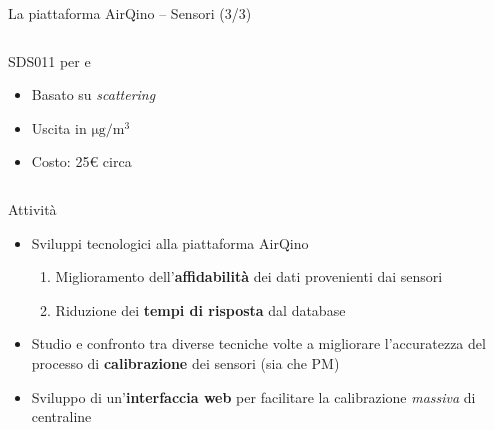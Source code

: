 \begin{frame}[t]{La piattaforma AirQino – Sensori (3/3)}
\begin{columns}
\begin{column}{0.5\textwidth}
\begin{center}
\begin{block}{SDS011 per  e }
\begin{figure}[H]
    \centering
\end{figure}
\vspace{0.1cm}
\begin{itemize}
  \item Basato su \textit{scattering}
  \item Uscita in $\mathrm{\si{\micro}g/m^3}$
  \item Costo: 25€ circa
\end{itemize}
\vspace{0.1cm}

\end{block}
\end{center}
\end{column}

\end{columns}
\end{frame}

\begin{frame}{Attività}
\begin{itemize}
  \item Sviluppi tecnologici alla piattaforma \alert{AirQino}
  \begin{enumerate}
    \item Miglioramento dell'\textbf{affidabilità} dei dati provenienti dai sensori
    \item Riduzione dei \textbf{tempi di risposta} dal database
  \end{enumerate}\vspace{0.3cm}
  \item Studio e confronto tra diverse tecniche volte a migliorare l’accuratezza del processo di \textbf{calibrazione} dei sensori (sia  che PM)\vspace{0.3cm}
  \item Sviluppo di un’\textbf{interfaccia web} per facilitare la calibrazione \textit{massiva} di centraline
\end{itemize}
\end{frame}


